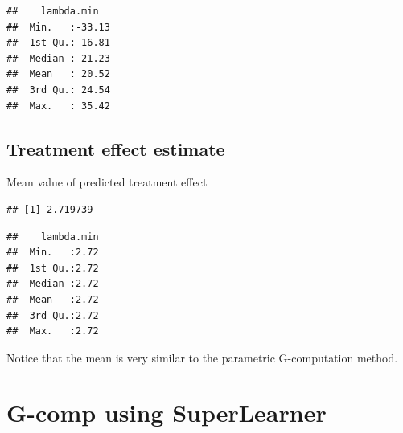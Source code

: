 \documentclass[
]{book}
\newenvironment{Shaded}{\begin{snugshade}}{\end{snugshade}}
\newcommand{\FunctionTok}[1]{\textcolor[rgb]{0.00,0.00,0.00}{#1}}
\newcommand{\NormalTok}[1]{#1}
\newcommand{\OtherTok}[1]{\textcolor[rgb]{0.56,0.35,0.01}{#1}}
\newcommand{\SpecialCharTok}[1]{\textcolor[rgb]{0.00,0.00,0.00}{#1}}
\begin{document}
\begin{verbatim}
##    lambda.min    
##  Min.   :-33.13  
##  1st Qu.: 16.81  
##  Median : 21.23  
##  Mean   : 20.52  
##  3rd Qu.: 24.54  
##  Max.   : 35.42
\end{verbatim}

\hypertarget{treatment-effect-estimate-2}{%
\subsection{Treatment effect estimate}\label{treatment-effect-estimate-2}}

\begin{Shaded}
\end{Shaded}

Mean value of predicted treatment effect

\begin{Shaded}
\end{Shaded}

\begin{verbatim}
## [1] 2.719739
\end{verbatim}

\begin{Shaded}
\end{Shaded}

\begin{verbatim}
##    lambda.min  
##  Min.   :2.72  
##  1st Qu.:2.72  
##  Median :2.72  
##  Mean   :2.72  
##  3rd Qu.:2.72  
##  Max.   :2.72
\end{verbatim}

Notice that the mean is very similar to the parametric G-computation method.

\hypertarget{g-comp-using-superlearner}{%
\section{G-comp using SuperLearner}\label{g-comp-using-superlearner}}
\end{document}
